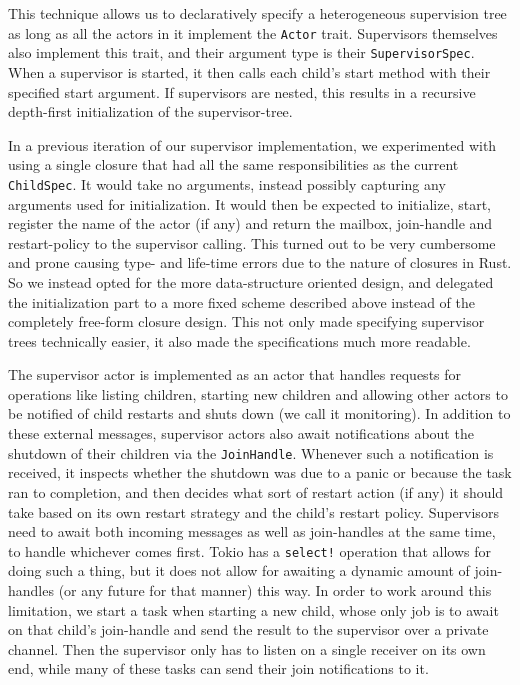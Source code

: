 \documentclass[a4paper]{article}
\begin{document}
\begin{itemize}
This technique allows us to declaratively specify a heterogeneous supervision
tree as long as all the actors in it implement the \texttt{Actor} trait.
Supervisors themselves also implement this trait, and their argument type is
their \texttt{SupervisorSpec}. When a supervisor is started, it then calls each
child's start method with their specified start argument. If supervisors are
nested, this results in a recursive depth-first initialization of the
supervisor-tree.

In a previous iteration of our supervisor implementation, we experimented with
using a single closure that had all the same responsibilities as the current
\texttt{ChildSpec}. It would take no arguments, instead possibly capturing any
arguments used for initialization. It would then be expected to
initialize, start, register the name of the actor (if any) and return the
mailbox, join-handle and restart-policy to the supervisor calling. This turned
out to be very cumbersome and prone causing type- and life-time errors due to
the nature of closures in Rust. So we instead opted for the more data-structure
oriented design, and delegated the initialization part to a more fixed scheme
described above instead of the completely free-form closure design. This not
only made specifying supervisor trees technically easier, it also made the
specifications much more readable.

The supervisor actor is implemented as an actor that handles
requests for operations like listing children, starting new children and
allowing other actors to be notified of child restarts and shuts down (we call it
monitoring). In addition to these external messages, supervisor actors also
await notifications about the shutdown of their children via the
\texttt{JoinHandle}. Whenever such a notification is received, it inspects
whether the shutdown was due to a panic or because the task ran to completion,
and then decides what sort of restart action (if any) it should take based on
its own restart strategy and the child's restart policy. Supervisors need to
await both incoming messages as well as join-handles at the same time, to handle
whichever comes first. Tokio has a \texttt{select!} operation that allows for
doing such a thing, but it does not allow for awaiting a dynamic amount of
join-handles (or any future for that manner) this way. In order to work
around this limitation, we start a task when starting a new child, whose only
job is to await on that child's join-handle and send the result to the
supervisor over a private channel. Then the supervisor only has to listen on a
single receiver on its own end, while many of these tasks can send their join
notifications to it.


\end{itemize}
\end{document}
